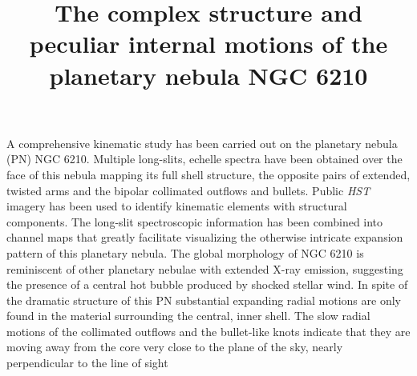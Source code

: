 \documentclass{aa}
\begin{document}
 

\title{The complex structure and peculiar internal motions of the planetary nebula NGC 6210}


\abstract
{A comprehensive kinematic study has been carried out on the planetary nebula (PN) NGC 6210. Multiple long-slits, echelle spectra have been obtained over the face of this nebula mapping its full shell structure, the opposite pairs of extended, twisted arms and the bipolar collimated outflows and bullets. Public {\it HST} imagery has been used to identify kinematic elements with structural components. The long-slit spectroscopic information has been combined into channel maps that greatly facilitate visualizing the otherwise intricate expansion pattern of this  planetary nebula. The global morphology of NGC 6210 is  reminiscent of other planetary nebulae with extended X-ray emission, suggesting the presence of a central hot bubble produced by shocked stellar wind. In spite of the dramatic structure of this PN substantial expanding radial motions are only found in the material surrounding the central, inner shell. The slow radial motions of the collimated outflows and the bullet-like knots indicate that they are  moving away from the core very close to the plane of the sky, nearly perpendicular to the line of sight}




\maketitle
\end{document}
